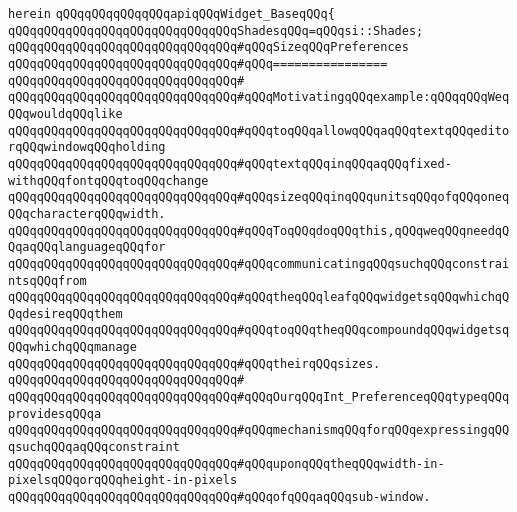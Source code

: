 \verb|herein|\newline
\newline
\verb|qQQqqQQqqQQqqQQqapiqQQqWidget_BaseqQQq{|\newline
\newline
\verb|qQQqqQQqqQQqqQQqqQQqqQQqqQQqqQQqShadesqQQq=qQQqsi::Shades;|\newline
\newline
\verb|qQQqqQQqqQQqqQQqqQQqqQQqqQQqqQQq#qQQqSizeqQQqPreferences|\newline
\verb|qQQqqQQqqQQqqQQqqQQqqQQqqQQqqQQq#qQQq================|\newline
\verb|qQQqqQQqqQQqqQQqqQQqqQQqqQQqqQQq#|\newline
\verb|qQQqqQQqqQQqqQQqqQQqqQQqqQQqqQQq#qQQqMotivatingqQQqexample:qQQqqQQqWeqQQqwouldqQQqlike|\newline
\verb|qQQqqQQqqQQqqQQqqQQqqQQqqQQqqQQq#qQQqtoqQQqallowqQQqaqQQqtextqQQqeditorqQQqwindowqQQqholding|\newline
\verb|qQQqqQQqqQQqqQQqqQQqqQQqqQQqqQQq#qQQqtextqQQqinqQQqaqQQqfixed-withqQQqfontqQQqtoqQQqchange|\newline
\verb|qQQqqQQqqQQqqQQqqQQqqQQqqQQqqQQq#qQQqsizeqQQqinqQQqunitsqQQqofqQQqoneqQQqcharacterqQQqwidth.|\newline
\verb|qQQqqQQqqQQqqQQqqQQqqQQqqQQqqQQq#qQQqToqQQqdoqQQqthis,qQQqweqQQqneedqQQqaqQQqlanguageqQQqfor|\newline
\verb|qQQqqQQqqQQqqQQqqQQqqQQqqQQqqQQq#qQQqcommunicatingqQQqsuchqQQqconstraintsqQQqfrom|\newline
\verb|qQQqqQQqqQQqqQQqqQQqqQQqqQQqqQQq#qQQqtheqQQqleafqQQqwidgetsqQQqwhichqQQqdesireqQQqthem|\newline
\verb|qQQqqQQqqQQqqQQqqQQqqQQqqQQqqQQq#qQQqtoqQQqtheqQQqcompoundqQQqwidgetsqQQqwhichqQQqmanage|\newline
\verb|qQQqqQQqqQQqqQQqqQQqqQQqqQQqqQQq#qQQqtheirqQQqsizes.|\newline
\verb|qQQqqQQqqQQqqQQqqQQqqQQqqQQqqQQq#|\newline
\verb|qQQqqQQqqQQqqQQqqQQqqQQqqQQqqQQq#qQQqOurqQQqInt_PreferenceqQQqtypeqQQqprovidesqQQqa|\newline
\verb|qQQqqQQqqQQqqQQqqQQqqQQqqQQqqQQq#qQQqmechanismqQQqforqQQqexpressingqQQqsuchqQQqaqQQqconstraint|\newline
\verb|qQQqqQQqqQQqqQQqqQQqqQQqqQQqqQQq#qQQquponqQQqtheqQQqwidth-in-pixelsqQQqorqQQqheight-in-pixels|\newline
\verb|qQQqqQQqqQQqqQQqqQQqqQQqqQQqqQQq#qQQqofqQQqaqQQqsub-window.|\newline

